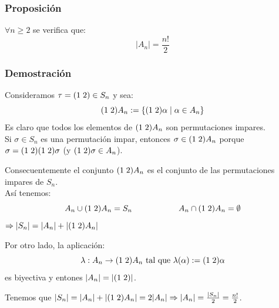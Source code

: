 \documentclass[11pt,a4paper]{article}
\begin{document}
\subsubsection*{Proposición}

$\forall n \geq 2$ se verifica que:
$$|A_{n}| = \frac{n!}{2}$$
 

 \subsubsection*{Demostración}
 
 Consideramos $\tau = (1 \hspace{0.1cm} 2) \in S_{n}$ y sea:
$$(1 \hspace{0.1cm} 2) A_{n}:= \{ (1 \hspace{0.1cm} 2) \alpha \mid \alpha \in A_{n}\}$$
Es claro que todos los elementos de $(1 \hspace{0.1cm} 2) A_{n}$ son permutaciones impares. \\
Si $\sigma \in S_{n}$ es una permutación impar, entonces $\sigma \in (1 \hspace{0.1cm} 2) A_{n}$ porque $\sigma = (1 \hspace{0.1cm} 2)(1 \hspace{0.1cm} 2)\sigma$ (y $(1 \hspace{0.1cm} 2) \sigma \in A_{n}$).

Consecuentemente el conjunto $(1 \hspace{0.1cm} 2)A_{n}$ es el conjunto de las permutaciones impares de $S_{n}$. \\
Así tenemos:
$$A_{n} \cup (1 \hspace{0.1cm} 2) A_{n} = S_{n} \hspace{2cm} A_{n} \cap (1 \hspace{0.1cm} 2) A_{n} = \emptyset$$
$\Rightarrow |S_{n}| = |A_{n}| + |(1 \hspace{0.1cm} 2)A_{n}|$

Por otro lado, la aplicación:
$$\lambda: A_{n} \to (1 \hspace{0.1cm} 2) A_{n} \text{ tal que } \lambda(\alpha) := (1 \hspace{0.1cm} 2) \alpha$$
es biyectiva y entones $|A_{n}| = |(1 \hspace{0.1cm} 2)|$.

Tenemos que $|S_{n}| = |A_{n}| + |(1 \hspace{0.1cm} 2) A_{n}| = 2|A_{n}| \Rightarrow |A_{n}| = \frac{|S_{n}|}{2} = \frac{n!}{2}$.
\end{document}

